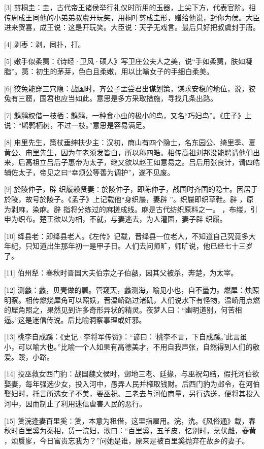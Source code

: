 \documentclass[12pt,UTF8]{ctexbook}
\begin{document}
[3] 剪桐圭：圭，古代帝王诸侯举行礼仪时所用的玉器，上尖下方，代表官阶。相传周成王同他的小弟弟叔虞开玩笑，用桐叶剪成圭形，赠给他说，封你为侯。大臣进来贺喜，成王说：这是开玩笑。大臣说：天子无戏言。最后只好把叔虞封于唐。

[4] 剥枣：剥，同扑，打。

[5] 嫩手似柔荑：《诗经·卫风·硕人》写卫庄公夫人之美，说“手如柔荑，肤如凝脂”。荑：初生的茅芽，色白且柔嫩，用以比喻女子的手细白柔美。

[6] 狡兔能穿三穴隐：战国时，齐公子孟尝君出谋划策，谋求安稳的地位，说，狡兔有三窟，国君也应当如此。意思是多方采取措施，寻找几条出路。

[7] 鹪鹩权借一枝栖：鹪鹩，一种食小虫的极小的鸟，又名“巧妇鸟”。《庄子》上说：“鹪鹩栖树，不过一枝。”意思是容易满足。

[8] 甪里先生，策杖垂绅扶少主：汉初，商山有四个隐士，名东园公、绮里季、夏黄公、甪里先生，因为年老须发皆白，所以称四皓。相传高祖刘邦没能聘请他们出来，后高祖立吕后子惠帝为太子，继又欲以赵王如意易之。吕后用张良计，请四皓辅佐太子，帝见之曰“幸烦公等善为调护”，遂不见废。

[9] 於陵仲子，辟 织履赖贤妻：於陵仲子，即陈仲子，战国时齐国的隐士。因居于於陵，故号於陵子。《孟子》上记载他“身织屦，妻辟 ”。织屦即织草鞋。辟 ，原为剥麻，染麻。辟 指将分练过的麻搓成线。麻是古代纺织原料之一。 ，布缕，引申为织布。楚王欲以为相，不就，与妻逃去，为人灌园，妻子辟 织履。

[10] 绛县老：即绛县老人。《左传》记载，晋绛县一位老人，不知道自己究竟多大年纪，只知道出生那年初一是甲子日。人们去问师旷，师旷说，他已经七十三岁了。

[11] 伯州犁：春秋时晋国大夫伯宗之子伯嚭，因其父被杀，奔楚，为太宰。

[12] 测蠡：蠡，贝壳做的瓢。管窥天，蠡测海，喻见小也，自不量力。燃犀：烛照明察。相传燃烧犀角可以照妖，晋温峤路过渚矶，人们说水下有怪物，温峤用点燃的犀角照之，果然见到许多奇形异状的精灵。夜梦人曰：“幽明道别，何苦相逼。”这是迷信传说。后比喻洞察事理或奸邪。

[13] 桃李自成蹊：《史记·李将军传赞》：“谚曰：‘桃李不言，下自成蹊。’此言虽小，可以喻大也。”比喻一个人如果有高德美才，不用自我声张，自然得到人们的敬爱。蹊，小路。

[14] 投巫救女西门豹：战国魏文侯时，邺地三老、廷掾，与巫祝勾结，假托河伯欲娶妻，每年强选少女，投入河中，愚弄人民并榨取钱财。后西门豹为邺令，在河伯娶妇时，托言所选女子不美，要巫祝、三老去与河伯商量，另行选送，便将其投入河中，因而制止了利用迷信虐害人民的恶行。

[15] 赁浣逢妻百里奚：赁，本意为租借，这里指雇用。浣，洗。《风俗通》载，春秋时百里奚为秦相，赁一浣妇，歌曰：“百里奚，五羊皮，忆别时，烹伏雌，舂黄 ，烦扊扅，今日富贵忘我为？”问她是谁，原来是被百里奚抛弃在故乡的妻子。
\end{document}
